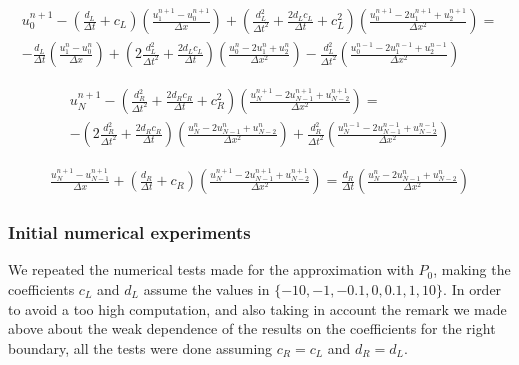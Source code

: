 \begin{equation}
\label{eq:appDiscTBCP1}
	\begin{aligned}
    u_0^{n+1} - \left( \frac{d_L}{\Delta t} + c_L \right) \left( \frac{u_1^{n+1} - u_0^{n+1}}{\Delta x}\right) +   \left( \frac{d_L^2}{\Delta t^2} + \frac{2d_Lc_L}{\Delta t} + c_L^2  \right) \left(  \frac{u_0^{n+1} - 2u_1^{n+1} + u_2^{n+1}}{\Delta x^2} \right)  = \\
        -\frac{d_L}{\Delta t}\left( \frac{u_1^{n} - u_0^{n}}{\Delta x}\right) +  \left( 2\frac{d_L^2}{\Delta t^2} + \frac{2d_Lc_L}{\Delta t}\right) \left(  \frac{u_0^{n} - 2u_1^n + u_2^{n}}{\Delta x^2} \right)    -  \frac{d_L^2}{\Delta t^2} \left(  \frac{u_0^{n-1} - 2u_1^{n-1} + u_2^{n-1}}{\Delta x^2} \right)
   \end{aligned}
\end{equation} 

\begin{equation}
	\begin{aligned}
    u_N^{n+1} - \left( \frac{d_R^2}{\Delta t^2} + \frac{2d_Rc_R}{\Delta t} + c_R^2  \right) \left(  \frac{u_{N}^{n+1} - 2u_{N-1}^{n+1} + u_{N-2}^{n+1}}{\Delta x^2} \right) = \\
     -\left( 2\frac{d_R^2}{\Delta t^2} + \frac{2d_Rc_R}{\Delta t}\right) \left(  \frac{u_N^{n} - 2u_{N-1}^n + u_{N-2}^{n}}{\Delta x^2} \right) + \frac{d_R^2}{\Delta t^2} \left(  \frac{u_N^{n-1} - 2u_{N-1}^{n-1} + u_{N-2}^{n-1}}{\Delta x^2} \right)
    \end{aligned}
\end{equation} 
   
\begin{equation}
	\begin{aligned}	
    \frac{u_N^{n+1} - u_{N-1}^{n+1}}{\Delta x} + \left( \frac{d_R}{\Delta t} + c_R \right) \left( \frac{u_N^{n+1} -2 u_{N-1}^{n+1} + u_{N-2}^{n+1}}{\Delta x^2}\right) =      \frac{d_R}{\Delta t}\left( \frac{u_{N}^{n} - 2u_{N-1}^{n} + u_{N-2}^n}{\Delta x^2}\right)
    \end{aligned}
\end{equation}

\subsubsection{Initial numerical experiments}

\indent We repeated the numerical tests made for the approximation with $P_0$, making the coefficients $c_L$ and $d_L$ assume the values in $\{-10,-1,-0.1,0,0.1,1,10\}$. In order to avoid a too high computation, and also taking in account the remark we made above about the weak dependence of the results on the coefficients for the right boundary, all the tests were done assuming $c_R = c_L$ and $d_R = d_L$.

